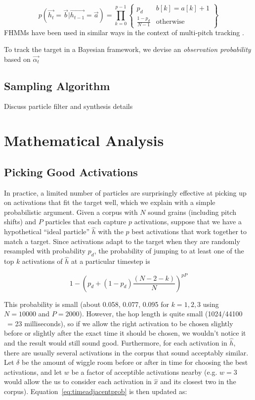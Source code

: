 \documentclass{article}
\begin{document}
		\begin{equation}
        	p(\vec{h_t} = \vec{b} | \vec{h_{t-1}} = \vec{a}) = \prod_{k=0}^{p-1} \left\{  \begin{array}{cc}  p_d & b[k] = a[k]+1  \\ \frac{1-p_d}{N-1} & \text{otherwise} \end{array} \right\}
		\end{equation}
        FHMMs have been used in similar ways in the context of multi-pitch tracking \cite{wohlmayr2010probabilistic}. 
        
        To track the target in a Bayesian framework, we devise an {\em observation probability} based on $\vec{\alpha_t}$


\subsection{Sampling Algorithm}
\label{sec:sampling}

Discuss particle filter and synthesis details


\section{Mathematical Analysis}

\subsection{Picking Good Activations}

In practice, a limited number of particles are surprisingly effective at picking up on activations that fit the target well, which we explain with a simple probabilistic argument.  Given a corpus with $N$ sound grains (including pitch shifts) and $P$ particles that each capture $p$ activations, suppose that we have a hypothetical ``ideal particle'' $\hat{h}$ with the $p$ best activations that work together to match a target.  Since activations adapt to the target when they are randomly resampled with probability $p_d$, the probability of jumping to at least one of the top $k$ activations of $\hat{h}$ at a particular timestep is 

\begin{equation}
    \label{eq:timeadjacentprob}
    1 - \left( p_d + (1-p_d) \frac{(N-2-k)}{N} \right)^{pP}
\end{equation}

This probability is small (about 0.058, 0.077, 0.095 for $k = 1, 2, 3$ using $N=10000$ and $P=2000$).  However, the hop length is quite small (1024/44100 ~= 23 milliseconds), so if we allow the right activation to be chosen slightly before or slightly after the exact time it should be chosen, we wouldn't notice it and the result would still sound good.  Furthermore, for each activation in $\hat{h}$, there are usually several activations in the corpus that sound acceptably similar.  Let $\delta$ be the amount of wiggle room before or after in time for choosing the best activations, and let $w$ be a factor of acceptible activations nearby (e.g. $w=3$ would allow the us to consider each activation in $\hat{x}$ and its closest two in the corpus).  Equation~\ref{eq:timeadjacentprob} is then updated as:
\end{document}
